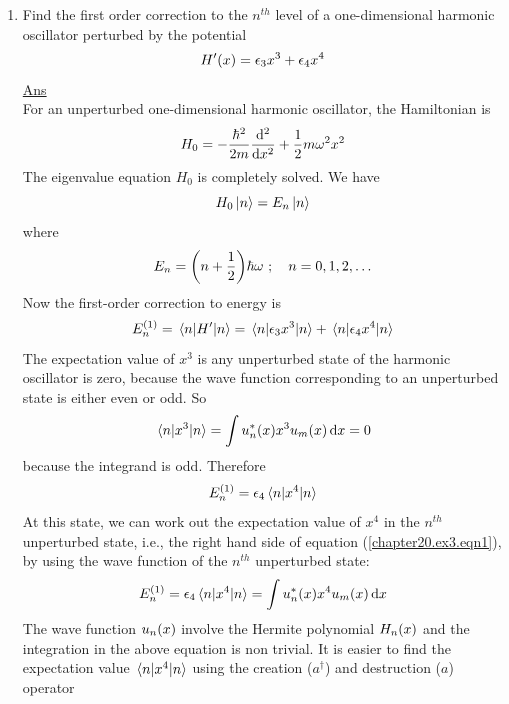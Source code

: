 \begin{enumerate}[label=Problem.\arabic*,start=1]
			
			\item Find the first order correction to the $n^{th}$ level of a one-dimensional harmonic oscillator perturbed by the potential
			\begin{equation*}
				H^\prime \qty(x) = \epsilon_3 x^3 + \epsilon_4 x^4
			\end{equation*}
			\underline{Ans}\\
			For an unperturbed one-dimensional harmonic oscillator, the Hamiltonian is
			\begin{equation*}
				H_0 = - \frac{\hbar^2}{2 m} \dv[2]{}{x} + \frac{1}{2 } m \omega^2 x^2
			\end{equation*}
			The eigenvalue equation $H_0$ is completely solved. We have
			\begin{equation}
				H_0 \ket{n} = E_n \ket{n}
			\end{equation}
			where
			\begin{equation}
				E_n = \qty(n + \frac{1}{2}) \hbar \omega \ ;\quad n=0,1,2,\ldots
			\end{equation}
			Now the first-order correction to energy is 
			\begin{equation}
				E_n^{(1)} = \expval{H^\prime}{n} = \expval{\epsilon_3 x^3}{n} + \expval{\epsilon_4 x^4}{n}
			\end{equation}
			The expectation value of $x^3$ is any unperturbed state of the harmonic oscillator is zero, because the wave function corresponding to an unperturbed state is either even or odd. So
			\begin{equation}
				\expval{x^3}{n} = \int u_n^*\qty(x) x^3 u_m\qty(x) \dd{x} = 0
			\end{equation}
			because the integrand is odd. Therefore
			\begin{equation}
				E_n^{(1)} = \epsilon_4 \expval{x^4}{n}
				\label{chapter20.ex3.eqn1}
			\end{equation}
			At this state, we can work out the expectation value of $x^4$ in the $n^{th}$ unperturbed state, i.e., the right hand side of equation (\ref{chapter20.ex3.eqn1}), by using the wave function of the $n^{th}$ unperturbed state:
			\begin{equation}
				E_n^{(1)} = \epsilon_4 \expval{x^4}{n} = \int u_n^*\qty(x) x^4 u_m\qty(x) \dd{x}
			\end{equation}
			The wave function $u_n\qty(x)$ involve the Hermite polynomial $H_n\qty(x)$ and the integration in the above equation is non trivial. It is easier to find the expectation value $\expval{x^4}{n}$ using the creation ($a^\dagger$) and destruction ($a$) operator

\end{enumerate}
